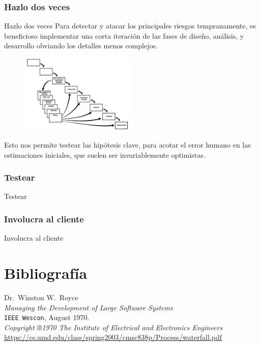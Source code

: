 \documentclass{beamer}
\begin{document}
\subsubsection{Hazlo dos veces}
\begin{frame}{Hazlo dos veces}
Para detectar y atacar los principales riesgos tempranamente, es beneficioso implementar una corta iteración de las fases de diseño, análisis, y desarrollo obviando los detalles menos complejos.

\begin{figure}
\includegraphics[width=0.5\textwidth]{figures/hazloDosVeces.png}
\end{figure}

Esto nos permite testear las hipótesis clave, para acotar el error humano en las estimaciones iniciales, que suelen ser invariablemente optimistas.

\end{frame}

\subsubsection{Testear}

\begin{frame}{Testear}

\end{frame}


\subsubsection{Involucra al cliente}

\begin{frame}{Involucra al cliente}

\end{frame}


\section{Bibliografía}

\begin{frame}[fragile]
\begin{thebibliography}{9}
  \footnotesize
  Dr.\ Winston W.\ Royce \\
  \emph{Managing the Development of Large Software Systems} \\
  \texttt{IEEE Wescon},
  August 1970. \\
  \textit{Copyright ®1970 The Institute of Electrical and Electronics Engineers} \\
  {\scriptsize\url{https://cs.umd.edu/class/spring2003/cmsc838p/Process/waterfall.pdf}}
\end{thebibliography}
\end{frame}
\end{document}
